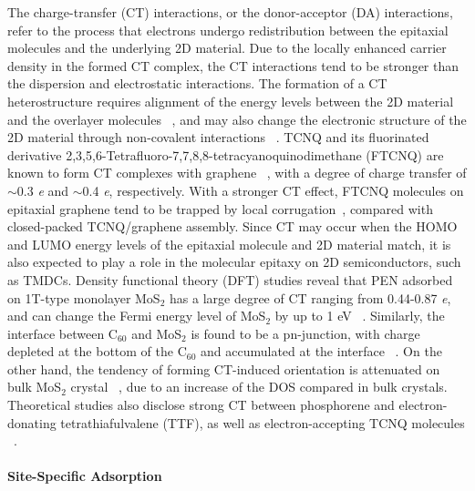 The charge-transfer (CT) interactions, or the donor-acceptor (DA)
interactions, refer to the process that electrons undergo
redistribution between the epitaxial molecules and the underlying 2D
material. Due to the locally enhanced carrier density in the formed CT
complex, the CT interactions tend to be stronger than the dispersion
and electrostatic interactions. The formation of a CT heterostructure
requires alignment of the energy levels between the 2D material and
the overlayer molecules ~\autocite{Akiyoshi_2015_DA}, and may also change
the electronic structure of the 2D material through non-covalent
interactions
~\autocite{Cai_2015_doping_2D_rev,Wehling_2008_doping,Zhang_2011_rev_pipi_gr}.
TCNQ and its fluorinated derivative
2,3,5,6-Tetra\-fluoro-7,7,8,8-tetra\-cyanoquino\-dimethane (FTCNQ) are
known to form CT complexes with graphene
~\autocite{Chen_2007_tcnq_gr_transfer,Voggu_2008_TCNQ,Barja_2010_assembl_donor_gr},
with a degree of charge transfer of $\sim{}$0.3 \textit{e} and
$\sim{}$0.4 \textit{e}, respectively. With a stronger CT effect, FTCNQ
molecules on epitaxial graphene tend to be trapped by local
corrugation~\autocite{Barja_2010_assembl_donor_gr}, compared with
closed-packed TCNQ/graphene assembly.  Since CT may occur when the
HOMO and LUMO energy levels of the epitaxial molecule and 2D material
match, it is also expected to play a role in the molecular epitaxy on
2D semiconductors, such as TMDCs. Density functional theory (DFT)
studies reveal that PEN adsorbed on 1T-type monolayer
MoS\(_{\text{2}}\) has a large degree of CT ranging from 0.44-0.87
\emph{e}, and can change the Fermi energy level of MoS\(_{\text{2}}\)
by up to 1 eV ~\autocite{Shen_2017_DFT_mos2_pent}. Similarly, the
interface between C\(_{\text{60}}\) and MoS\(_{\text{2}}\) is found to
be a pn-junction, with charge depleted at the bottom of the
C\(_{\text{60}}\) and accumulated at the interface
~\autocite{Chen_2016_c60_mos2}. On the other hand, the tendency of forming
CT-induced orientation is attenuated on bulk MoS\(_{\text{2}}\)
crystal ~\autocite{Sakurai_1991_c60_mos2}, due to an increase of the DOS
compared in bulk crystals. Theoretical studies also disclose strong CT
between phosphorene and electron-donating tetrathiafulvalene (TTF), as
well as electron-accepting TCNQ molecules
~\autocite{Zhang_2015_DA_phosphorene}.


\paragraph{Site-Specific Adsorption}
\label{sec:org87b0c12}

